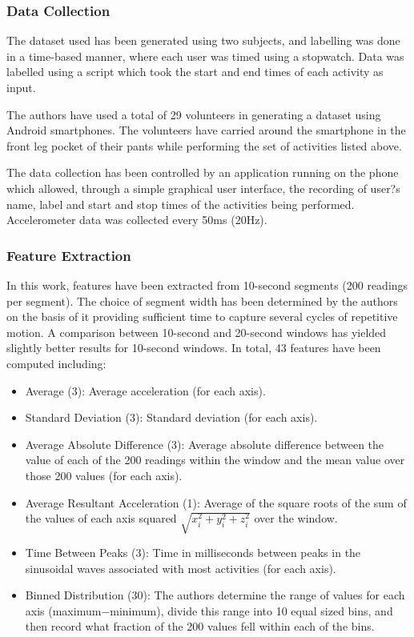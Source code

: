 \subsubsection{Data Collection}
The dataset used has been generated using two subjects, and labelling was done in a time-based manner, where each user was timed using a stopwatch. Data was labelled using a script which took the start and end times of each activity as input.

The authors have used a total of 29 volunteers in generating a dataset using Android smartphones. The volunteers have carried around the smartphone in the front leg pocket of their pants while performing the set of activities listed above. 

The data collection has been controlled by an application running on the phone which allowed, through a simple graphical user interface, the recording of user?s name, label and start and stop times of the activities being performed. Accelerometer data was collected every 50ms (20Hz). 

\subsubsection{Feature Extraction}
In this work, features have been extracted from 10-second segments (200 readings per segment). The choice of segment width has been determined by the authors on the basis of it providing sufficient time to capture several cycles of repetitive motion. A comparison between 10-second and 20-second windows has yielded slightly better results for 10-second windows.
In total, 43 features have been computed including:
\begin{itemize}
\item{Average (3): Average acceleration (for each axis).}
\item{Standard Deviation (3): Standard deviation (for each axis).}
\item{Average Absolute Difference (3): Average absolute difference between the value of each of the 200 readings within the window and the mean value over those 200 values (for each axis).}
\item{Average Resultant Acceleration (1): Average of the square roots of the sum of the values of each axis squared $\sqrt{x_i^2+y_i^2+z_i^2}$ over the window.}
\item{Time Between Peaks (3): Time in milliseconds between peaks in the sinusoidal waves associated with most activities (for each axis).}
\item{Binned Distribution (30): The authors determine the range of values for each axis (maximum$-$minimum), divide this range into 10 equal sized bins, and then record what fraction of the 200 values fell within each of the bins.}
\end{itemize}

